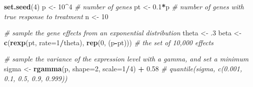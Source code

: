 \documentclass[]{book}
\newenvironment{Shaded}{\begin{snugshade}}{\end{snugshade}}
\newcommand{\CommentTok}[1]{\textcolor[rgb]{0.56,0.35,0.01}{\textit{#1}}}
\newcommand{\DataTypeTok}[1]{\textcolor[rgb]{0.13,0.29,0.53}{#1}}
\newcommand{\DecValTok}[1]{\textcolor[rgb]{0.00,0.00,0.81}{#1}}
\newcommand{\FloatTok}[1]{\textcolor[rgb]{0.00,0.00,0.81}{#1}}
\newcommand{\KeywordTok}[1]{\textcolor[rgb]{0.13,0.29,0.53}{\textbf{#1}}}
\newcommand{\NormalTok}[1]{#1}
\newcommand{\OperatorTok}[1]{\textcolor[rgb]{0.81,0.36,0.00}{\textbf{#1}}}
\newcommand{\StringTok}[1]{\textcolor[rgb]{0.31,0.60,0.02}{#1}}
\begin{document}
\begin{Shaded}
\begin{Highlighting}[]
\KeywordTok{set.seed}\NormalTok{(}\DecValTok{4}\NormalTok{)}
\NormalTok{p <-}\StringTok{ }\DecValTok{10}\OperatorTok{^}\DecValTok{4} \CommentTok{# number of genes}
\NormalTok{pt <-}\StringTok{ }\FloatTok{0.1}\OperatorTok{*}\NormalTok{p }\CommentTok{# number of genes with true response to treatment}
\NormalTok{n <-}\StringTok{ }\DecValTok{10}

\CommentTok{# sample the gene effects from an exponential distribution}
\NormalTok{theta <-}\StringTok{ }\FloatTok{.3}
\NormalTok{beta <-}\StringTok{ }\KeywordTok{c}\NormalTok{(}\KeywordTok{rexp}\NormalTok{(pt, }\DataTypeTok{rate=}\DecValTok{1}\OperatorTok{/}\NormalTok{theta),}
          \KeywordTok{rep}\NormalTok{(}\DecValTok{0}\NormalTok{, (p}\OperatorTok{-}\NormalTok{pt))) }\CommentTok{# the set of 10,000 effects}

\CommentTok{# sample the variance of the expression level with a gamma, and set a minimum}
\NormalTok{sigma <-}\StringTok{ }\KeywordTok{rgamma}\NormalTok{(p, }\DataTypeTok{shape=}\DecValTok{2}\NormalTok{, }\DataTypeTok{scale=}\DecValTok{1}\OperatorTok{/}\DecValTok{4}\NormalTok{) }\OperatorTok{+}\StringTok{ }\FloatTok{0.58}
\CommentTok{# quantile(sigma, c(0.001, 0.1, 0.5, 0.9, 0.999))}


\end{Highlighting}
\end{Shaded}
\end{document}
